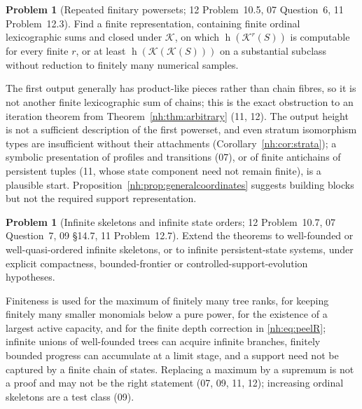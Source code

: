 \documentclass[11pt,a4paper]{article}
\theoremstyle{definition}
\newtheorem{problem}[theorem]{Problem}
\theoremstyle{remark}
\newcommand{\K}{\mathcal K}
\newcommand{\hgt}{\operatorname{h}}
\begin{document}
\begin{problem}[Repeated finitary powersets; 12 Problem~10.5, 07 Question~6, 11 Problem~12.3]
\label{nh:prob:iteration}
Find a finite representation, containing finite ordinal lexicographic sums and
closed under $\K$, on which $\hgt(\K^r(S))$ is computable for every finite $r$, or
at least $\hgt(\K(\K(S)))$ on a substantial subclass without reduction to finitely
many numerical samples.
\end{problem}
The first output generally has product-like pieces rather than chain fibres, so it
is not another finite lexicographic sum of chains; this is the exact obstruction to
an iteration theorem from Theorem~\ref{nh:thm:arbitrary} (11, 12). The output height
is not a sufficient description of the first powerset, and even stratum isomorphism
types are insufficient without their attachments (Corollary~\ref{nh:cor:strata});
a symbolic presentation of profiles and transitions (07), or of finite antichains of
persistent tuples (11, whose state component need not remain finite), is a
plausible start. Proposition~\ref{nh:prop:generalcoordinates} suggests building
blocks but not the required support representation.

\begin{problem}[Infinite skeletons and infinite state orders; 12 Problem~10.7, 07 Question~7, 09 \S14.7, 11 Problem~12.7]
\label{nh:prob:infinite}
Extend the theorems to well-founded or well-quasi-ordered infinite skeletons, or to
infinite persistent-state systems, under explicit compactness, bounded-frontier or
controlled-support-evolution hypotheses.
\end{problem}
Finiteness is used for the maximum of finitely many tree ranks, for keeping finitely
many smaller monomials below a pure power, for the existence of a largest active
capacity, and for the finite depth correction in \eqref{nh:eq:peelR}; infinite unions
of well-founded trees can acquire infinite branches, finitely bounded progress can
accumulate at a limit stage, and a support need not be captured by a finite chain of
states. Replacing a maximum by a supremum is not a proof and may not be the right
statement (07, 09, 11, 12); increasing ordinal skeletons are a test class (09).
\end{document}
